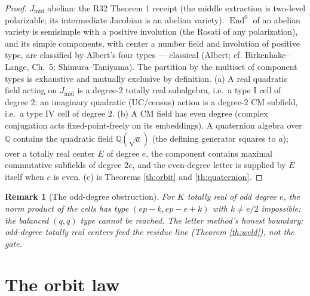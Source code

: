 \documentclass[11pt]{article}
\newcommand{\Q}{\mathbb Q}
\newcommand{\End}{\operatorname{End}}
\newtheorem{remark}[theorem]{Remark}
\begin{document}
\begin{proof}
$J_{\mathrm{mid}}$ abelian: the R32 Theorem 1 receipt (the middle
extraction is two-level polarizable; its intermediate Jacobian is an
abelian variety). $\End^0$ of an abelian variety is semisimple with a
positive involution (the Rosati of any polarization), and its simple
components, with center a number field and involution of positive
type, are classified by Albert's four types --- classical (Albert;
cf. Birkenhake--Lange, Ch.~5; Shimura--Taniyama). The partition by the
multiset of component types is exhaustive and mutually exclusive by
definition. (a) A real quadratic field acting on $J_{\mathrm{mid}}$ is
a degree-$2$ totally real subalgebra, i.e.\ a type I cell of degree
$2$; an imaginary quadratic (UC/census) action is a degree-$2$ CM
subfield, i.e.\ a type IV cell of degree $2$. (b) A CM field has even
degree (complex conjugation acts fixed-point-freely on its
embeddings). A quaternion algebra over $\Q$ contains the quadratic
field $\Q(\sqrt a)$ (the defining generator squares to $a$); over a
totally real center $E$ of degree $e$, the component contains maximal
commutative subfields of degree $2e$, and the even-degree letter is
supplied by $E$ itself when $e$ is even. (c) is Theorems
\ref{th:orbit} and \ref{th:quaternion}.
\end{proof}

\begin{remark}[The odd-degree obstruction]
\label{rmk:odd}
For $K$ totally real of odd degree $e$, the norm product of the cells
has type $(ep-k, ep-e+k)$ with $k\neq e/2$ impossible: the balanced
$(q,q)$ type cannot be reached. The letter method's honest boundary:
odd-degree totally real centers feed the residue line (Theorem
\ref{th:weld}), not the gate.
\end{remark}

\section{The orbit law}
\end{document}
